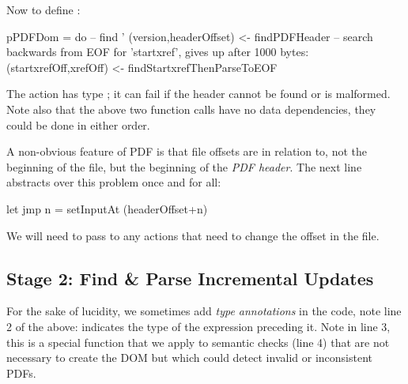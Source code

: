 
Now to define :
\begin{code}
pPDFDom =
    do
    -- find '%
    (version,headerOffset) <- findPDFHeader
    -- search backwards from EOF for 'startxref', gives up after 1000 bytes:
    (startxrefOff,xrefOff) <- findStartxrefThenParseToEOF
\end{code}

The action  has type ;
it can fail if the header cannot be found or is malformed.
%
Note also that the above two function calls have no data dependencies, they
could be done in either order.

A non-obvious feature of PDF is that file offsets are in relation to, not the
beginning of the file, but the beginning of the \emph{PDF header}.
%
The next line abstracts over this problem once and for all:
\begin{code}  
    let jmp n = setInputAt (headerOffset+n)
\end{code}
We will need to pass  to any actions that need to change
the offset in the file.

\subsection{Stage 2: Find \& Parse Incremental Updates}


For the sake of lucidity, we sometimes add \emph{type annotations} in the code,
note line 2 of the above:  indicates the type of
the expression preceding it.
%
Note  in line 3, this is a special function that we apply to
semantic checks (line 4) that are not necessary to create the DOM but which
could detect invalid or inconsistent PDFs.

